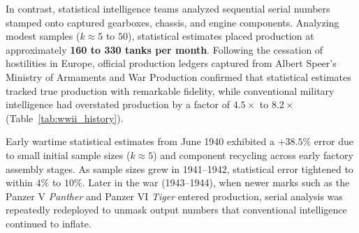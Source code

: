 \documentclass[10pt,a4paper]{article}
\begin{document}
In contrast, statistical intelligence teams analyzed sequential serial numbers stamped onto captured gearboxes, chassis, and engine components. Analyzing modest samples ($k \approx 5$ to $50$), statistical estimates placed production at approximately \textbf{160 to 330 tanks per month}. Following the cessation of hostilities in Europe, official production ledgers captured from Albert Speer's Ministry of Armaments and War Production confirmed that statistical estimates tracked true production with remarkable fidelity, while conventional military intelligence had overstated production by a factor of $4.5\times$ to $8.2\times$ (Table~\ref{tab:wwii_history}).

\begin{table}[H]
\centering
\caption{Historical German Tank Production: Allied Intelligence Estimates vs.\ Post-War Speer Ministry Records. Data sourced from Ruggles and Brodie~\cite{ruggles1947} (reporting Allied intelligence consensus and captured Speer Ministry ledgers) and Goodman~\cite{goodman1954} (mathematical analysis of sequential component serials). Official production figures represent post-war archival counts from the Speer Ministry / Heereswaffenamt; conventional estimates represent Allied intelligence consensus from prisoner interrogations and reconnaissance; statistical estimates represent discrete order-statistic estimates calculated from captured chassis and gearbox serials.}
\label{tab:wwii_history}
\end{table}

Early wartime statistical estimates from June 1940 exhibited a $+38.5\%$ error due to small initial sample sizes ($k \approx 5$) and component recycling across early factory assembly stages. As sample sizes grew in 1941--1942, statistical error tightened to within $4\%$ to $10\%$. Later in the war (1943--1944), when newer marks such as the Panzer V \textit{Panther} and Panzer VI \textit{Tiger} entered production, serial analysis was repeatedly redeployed to unmask output numbers that conventional intelligence continued to inflate.
\end{document}
